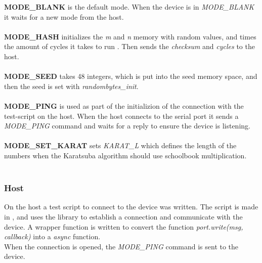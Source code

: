 \textbf{MODE_BLANK} is the default mode. When the device is in \textit{MODE_BLANK} it waits for a new mode from the host.\\
\\

\textbf{MODE_HASH} initializes the \textit{m} and \textit{n} memory with random values, and times the amount of cycles it takes to run . Then sends the \textit{checksum} and \textit{cycles} to the host.\\ 
\\

\textbf{MODE_SEED} takes 48 integers, which is put into the seed memory space, and then the seed is set with \textit{randombytes_init}.\\
\\

\textbf{MODE_PING} is used as part of the initializion of the connection with the test-script on the host. When the host connects to the serial port it sends a \textit{MODE_PING} command and waits for a reply to ensure the device is listening.\\
\\

\textbf{MODE_SET_KARAT} sets \textit{KARAT_L} which defines the length of the numbers when the Karatsuba algorithm should use schoolbook multiplication.\\
\\

\subsubsection{Host}
On the host a test script to connect to the device was written. The script is made in \cite[NodeJS]{nodejs}, and uses the library \cite[SerialPort]{serialport} to establish a connection and communicate with the device.
A wrapper function is written to convert the function \textit{port.write(msg, callback)} into a \textit{async} function. 
\\

When the connection is opened, the \textit{MODE_PING} command is sent to the device.\\
\\

